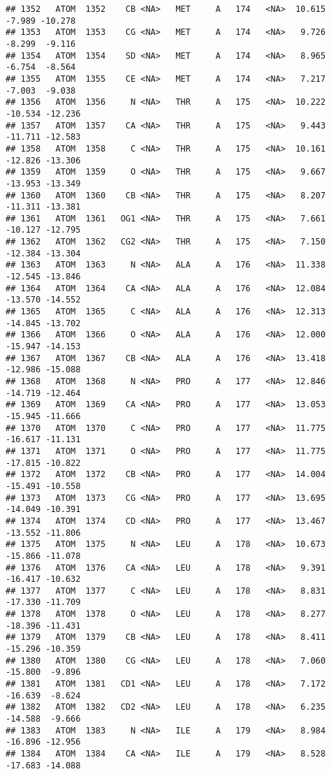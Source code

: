 \documentclass[
]{article}
\begin{document}
\begin{verbatim}
## 1352   ATOM  1352    CB <NA>   MET     A   174   <NA>  10.615  -7.989 -10.278
## 1353   ATOM  1353    CG <NA>   MET     A   174   <NA>   9.726  -8.299  -9.116
## 1354   ATOM  1354    SD <NA>   MET     A   174   <NA>   8.965  -6.754  -8.564
## 1355   ATOM  1355    CE <NA>   MET     A   174   <NA>   7.217  -7.003  -9.038
## 1356   ATOM  1356     N <NA>   THR     A   175   <NA>  10.222 -10.534 -12.236
## 1357   ATOM  1357    CA <NA>   THR     A   175   <NA>   9.443 -11.711 -12.583
## 1358   ATOM  1358     C <NA>   THR     A   175   <NA>  10.161 -12.826 -13.306
## 1359   ATOM  1359     O <NA>   THR     A   175   <NA>   9.667 -13.953 -13.349
## 1360   ATOM  1360    CB <NA>   THR     A   175   <NA>   8.207 -11.311 -13.381
## 1361   ATOM  1361   OG1 <NA>   THR     A   175   <NA>   7.661 -10.127 -12.795
## 1362   ATOM  1362   CG2 <NA>   THR     A   175   <NA>   7.150 -12.384 -13.304
## 1363   ATOM  1363     N <NA>   ALA     A   176   <NA>  11.338 -12.545 -13.846
## 1364   ATOM  1364    CA <NA>   ALA     A   176   <NA>  12.084 -13.570 -14.552
## 1365   ATOM  1365     C <NA>   ALA     A   176   <NA>  12.313 -14.845 -13.702
## 1366   ATOM  1366     O <NA>   ALA     A   176   <NA>  12.000 -15.947 -14.153
## 1367   ATOM  1367    CB <NA>   ALA     A   176   <NA>  13.418 -12.986 -15.088
## 1368   ATOM  1368     N <NA>   PRO     A   177   <NA>  12.846 -14.719 -12.464
## 1369   ATOM  1369    CA <NA>   PRO     A   177   <NA>  13.053 -15.945 -11.666
## 1370   ATOM  1370     C <NA>   PRO     A   177   <NA>  11.775 -16.617 -11.131
## 1371   ATOM  1371     O <NA>   PRO     A   177   <NA>  11.775 -17.815 -10.822
## 1372   ATOM  1372    CB <NA>   PRO     A   177   <NA>  14.004 -15.491 -10.558
## 1373   ATOM  1373    CG <NA>   PRO     A   177   <NA>  13.695 -14.049 -10.391
## 1374   ATOM  1374    CD <NA>   PRO     A   177   <NA>  13.467 -13.552 -11.806
## 1375   ATOM  1375     N <NA>   LEU     A   178   <NA>  10.673 -15.866 -11.078
## 1376   ATOM  1376    CA <NA>   LEU     A   178   <NA>   9.391 -16.417 -10.632
## 1377   ATOM  1377     C <NA>   LEU     A   178   <NA>   8.831 -17.330 -11.709
## 1378   ATOM  1378     O <NA>   LEU     A   178   <NA>   8.277 -18.396 -11.431
## 1379   ATOM  1379    CB <NA>   LEU     A   178   <NA>   8.411 -15.296 -10.359
## 1380   ATOM  1380    CG <NA>   LEU     A   178   <NA>   7.060 -15.800  -9.896
## 1381   ATOM  1381   CD1 <NA>   LEU     A   178   <NA>   7.172 -16.639  -8.624
## 1382   ATOM  1382   CD2 <NA>   LEU     A   178   <NA>   6.235 -14.588  -9.666
## 1383   ATOM  1383     N <NA>   ILE     A   179   <NA>   8.984 -16.896 -12.956
## 1384   ATOM  1384    CA <NA>   ILE     A   179   <NA>   8.528 -17.683 -14.088

\end{verbatim}
\end{document}
